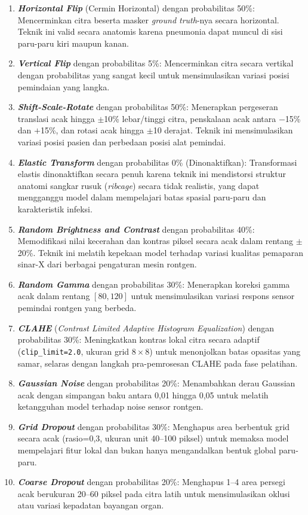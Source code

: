 \documentclass[12pt,a4paper,oneside]{book}
\begin{document}
\begin{enumerate}
  \item \textbf{\textit{Horizontal Flip}} (Cermin Horizontal) dengan probabilitas 50\%: Mencerminkan citra beserta masker \textit{ground truth}-nya secara horizontal. Teknik ini valid secara anatomis karena pneumonia dapat muncul di sisi paru-paru kiri maupun kanan.
  \item \textbf{\textit{Vertical Flip}} dengan probabilitas 5\%: Mencerminkan citra secara vertikal dengan probabilitas yang sangat kecil untuk mensimulasikan variasi posisi pemindaian yang langka.
  \item \textbf{\textit{Shift-Scale-Rotate}} dengan probabilitas 50\%: Menerapkan pergeseran translasi acak hingga $\pm$10\% lebar/tinggi citra, penskalaan acak antara $-$15\% dan $+$15\%, dan rotasi acak hingga $\pm$10 derajat. Teknik ini mensimulasikan variasi posisi pasien dan perbedaan posisi alat pemindai.
  \item \textbf{\textit{Elastic Transform}} dengan probabilitas 0\% (Dinonaktifkan): Transformasi elastis dinonaktifkan secara penuh karena teknik ini mendistorsi struktur anatomi sangkar rusuk (\textit{ribcage}) secara tidak realistis, yang dapat mengganggu model dalam mempelajari batas spasial paru-paru dan karakteristik infeksi.
  \item \textbf{\textit{Random Brightness and Contrast}} dengan probabilitas 40\%: Memodifikasi nilai kecerahan dan kontras piksel secara acak dalam rentang $\pm$20\%. Teknik ini melatih kepekaan model terhadap variasi kualitas pemaparan sinar-X dari berbagai pengaturan mesin rontgen.
  \item \textbf{\textit{Random Gamma}} dengan probabilitas 30\%: Menerapkan koreksi gamma acak dalam rentang $[80, 120]$ untuk mensimulasikan variasi respons sensor pemindai rontgen yang berbeda.
  \item \textbf{\textit{CLAHE}} (\textit{Contrast Limited Adaptive Histogram Equalization}) dengan probabilitas 30\%: Meningkatkan kontras lokal citra secara adaptif (\texttt{clip\_limit=2.0}, ukuran grid $8\times8$) untuk menonjolkan batas opasitas yang samar, selaras dengan langkah pra-pemrosesan CLAHE pada fase pelatihan.
  \item \textbf{\textit{Gaussian Noise}} dengan probabilitas 20\%: Menambahkan derau Gaussian acak dengan simpangan baku antara 0,01 hingga 0,05 untuk melatih ketangguhan model terhadap noise sensor rontgen.
  \item \textbf{\textit{Grid Dropout}} dengan probabilitas 30\%: Menghapus area berbentuk grid secara acak (rasio=0,3, ukuran unit 40--100 piksel) untuk memaksa model mempelajari fitur lokal dan bukan hanya mengandalkan bentuk global paru-paru.
  \item \textbf{\textit{Coarse Dropout}} dengan probabilitas 20\%: Menghapus 1--4 area persegi acak berukuran 20--60 piksel pada citra latih untuk mensimulasikan oklusi atau variasi kepadatan bayangan organ.
\end{enumerate}
\end{document}
